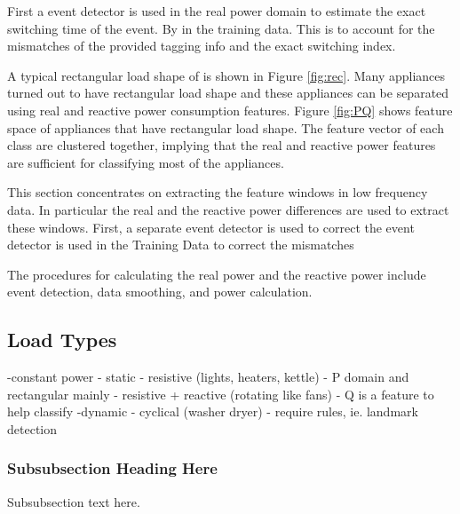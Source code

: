 \documentclass[conference]{IEEEtran}
\begin{document}
	
	

First a event detector is used in the real power domain to estimate the exact switching time of the event.  By  in the training data.  This is to account for the mismatches of the provided tagging info and the exact switching index.  

A typical rectangular load shape of is shown in Figure \ref{fig:rec}.  Many appliances turned out to have rectangular load shape and these appliances can be separated using real and reactive power consumption features.  Figure \ref{fig:PQ} shows feature space of appliances that have rectangular load shape.  The feature vector of each class are clustered together, implying that the real and reactive power features are sufficient for classifying most of the appliances.


This section concentrates on extracting the feature windows in low frequency data.  In particular the real and the reactive power differences are used to extract these windows.  First, a separate event detector is used to correct the   event detector is used in the Training Data to correct the mismatches 



The procedures for calculating the real power and the reactive power include event detection, data smoothing, and power calculation.

\subsection{Load Types}
-constant power - static 
	- resistive (lights, heaters, kettle) - P domain and rectangular mainly
	- resistive + reactive (rotating like fans) - Q is a feature to help classify
-dynamic
	- cyclical (washer dryer) - require rules, ie. landmark detection

	
\subsubsection{Subsubsection Heading Here}
Subsubsection text here.
\end{document}

